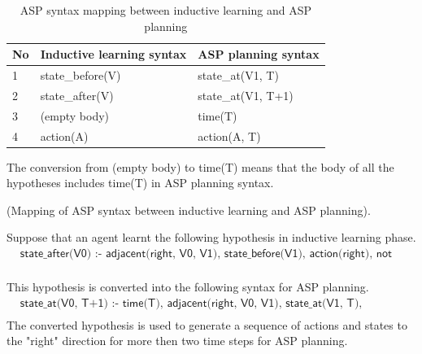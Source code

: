 \begin{table}[H]
\centering
\begin{tabular}{|l|p{5cm}|p{5cm}|}
\hline
No & Inductive learning syntax & ASP planning syntax\\ \hline
1 & \textsf{state\_before(V)} & \textsf{state\_at(V1, T)}  \\ \hline
2 & \textsf{state\_after(V)} & \textsf{state\_at(V1, T+1)}  \\ \hline
3 & \textsf{(empty body)} & \textsf{time(T)}  \\ \hline
4 & \textsf{action(A)} & \textsf{action(A, T)}  \\ \hline
\end{tabular}
\caption{ASP syntax mapping between inductive learning and ASP planning}
\label{table:extension_specification}
\end{table}
The conversion from (empty body) to \textsf{time(T)} means that the body of all the hypotheses includes \textsf{time(T)} in ASP planning syntax.
\begin{examp} \normalfont (Mapping of ASP syntax between inductive learning and ASP planning).

Suppose that an agent learnt the following hypothesis in inductive learning phase. 
\begin{equation*}
\begin{split}
&\textsf{state\_after(V0) :- adjacent(right, V0, V1), state\_before(V1), action(right), not wall(V0).}\\
\end{split}
\end{equation*}

This hypothesis is converted into the following syntax for ASP planning.
\begin{equation*}
\begin{split}
&\textsf{state\_at(V0, T+1) :- time(T), adjacent(right, V0, V1), state\_at(V1, T), action(right, T), not wall(V0).}\\
\end{split}
\end{equation*}
The converted hypothesis is used to generate a sequence of actions and states to the "right" direction for more then two time steps for ASP planning.
\end{examp}

